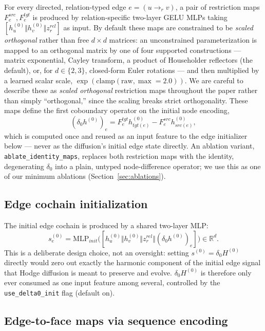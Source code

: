 \documentclass{article}
\newcommand{\R}{\mathbb{R}}
\begin{document}
For every directed, relation-typed edge $e = (u \to_r v)$, a pair of restriction maps
$F^{src}_e, F^{tgt}_e$ is produced by relation-specific two-layer GELU MLPs taking
$[h^{(0)}_u \Vert h^{(0)}_v \Vert z^{rel}_r]$ as input. By default these maps are constrained to be
\emph{scaled orthogonal} rather than free $d\times d$ matrices: an unconstrained parameterization is
mapped to an orthogonal matrix by one of four supported constructions --- matrix exponential,
Cayley transform, a product of Householder reflectors (the default), or, for $d\in\{2,3\}$,
closed-form Euler rotations --- and then multiplied by a learned scalar scale,
$\exp(\mathrm{clamp}(\text{raw}, \max=2.0))$. We are careful to describe these as \emph{scaled
orthogonal} restriction maps throughout the paper rather than simply ``orthogonal,'' since the
scaling breaks strict orthogonality. These maps define the first coboundary operator on the initial
node encoding,
\begin{equation}
  (\delta_0 h^{(0)})_e = F^{tgt}_e h^{(0)}_{tgt(e)} - F^{src}_e h^{(0)}_{src(e)},
  \label{eq:delta0-h0}
\end{equation}
which is computed once and reused as an input feature to the edge initializer below --- never as
the diffusion's initial edge state directly. An ablation variant, \texttt{ablate\_identity\_maps},
replaces both restriction maps with the identity, degenerating $\delta_0$ into a plain, untyped
node-difference operator; we use this as one of our minimum ablations
(Section~\ref{sec:ablations}).

\subsection{Edge cochain initialization}

The initial edge cochain is produced by a shared two-layer MLP:
\begin{equation}
  s^{(0)}_e = \mathrm{MLP}_{init}\big([h^{(0)}_u \Vert h^{(0)}_v \Vert z^{rel}_r \Vert (\delta_0 h^{(0)})_e]\big) \in \R^d.
\end{equation}
This is a deliberate design choice, not an oversight: setting $s^{(0)} = \delta_0 H^{(0)}$ directly
would zero out exactly the harmonic component of the initial edge signal that Hodge diffusion is
meant to preserve and evolve. $\delta_0 H^{(0)}$ is therefore only ever consumed as one input
feature among several, controlled by the \texttt{use\_delta0\_init} flag (default on).

\subsection{Edge-to-face maps via sequence encoding}
\end{document}
